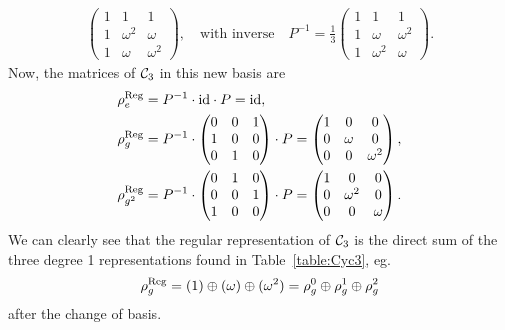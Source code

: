 {\begin{example}
\begin{align*}
\begin{pmatrix}
				1&1&1 \\
				1&\omega^2&\omega \\
				1&\omega&\omega^2
			\end{pmatrix}, \quad \text{with inverse} \quad P^{-1} = \frac{1}{3}\begin{pmatrix}
				1&1&1 \\
				1&\omega&\omega^2 \\
				1&\omega^2&\omega
			\end{pmatrix}.
		\end{align*}
		Now, the matrices of $\mathcal{C}_3$ in this new basis are
		\begin{align*}
			\rho_e^{\text{Reg}} &= P^{-1} \cdot \text{id} \cdot P = \text{id}, \\ 
			\rho_g^{\text{Reg}} &= P^{-1}\cdot\begin{pmatrix}
				0&0&1 \\ 1&0&0 \\ 0&1&0
			\end{pmatrix}\cdot P = \begin{pmatrix}
			1&0&0 \\ 0&\omega&0 \\ 0&0&\omega^2
			\end{pmatrix}, \\
			\rho_{g^2}^{\text{Reg}} &= P^{-1}\cdot\begin{pmatrix}
				0&1&0 \\ 0&0&1 \\ 1&0&0 
			\end{pmatrix}\cdot P = \begin{pmatrix}
			1&0&0 \\ 0&\omega^2&0 \\ 0&0&\omega
			\end{pmatrix}.
		\end{align*}
		We can clearly see that the regular representation of $\mathcal{C}_3$ is the direct sum of the three degree 1 representations found in Table~\ref{table:Cyc3}, eg. 
		\begin{align*}
			\rho_g^{\text{Reg}} = (1) \oplus (\omega) \oplus (\omega^2) = \rho^0_g \oplus \rho^1_g \oplus \rho^2_g
		\end{align*}
		after the change of basis.
	\end{example}}
	

